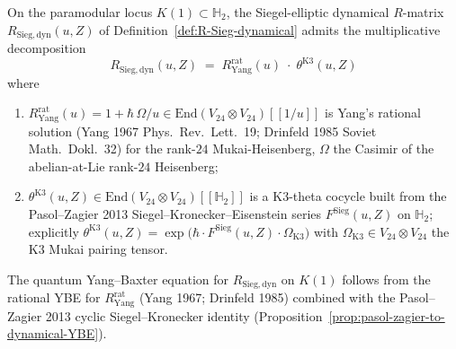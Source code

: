 \begin{theorem}
\label{thm:kcb-r-sieg-factorisation}
On the paramodular locus $K(1)\subset\mathbb{H}_2$, the
Siegel-elliptic dynamical $R$-matrix
$R_{\mathrm{Sieg,dyn}}(u, Z)$ of Definition~\ref{def:R-Sieg-dynamical}
admits the multiplicative decomposition
\[
 R_{\mathrm{Sieg,dyn}}(u, Z)
 \;=\; R^{\mathrm{rat}}_{\mathrm{Yang}}(u)\;\cdot\;
 \theta^{\mathrm{K3}}(u, Z)
\]
where
\begin{enumerate}[label=\textup{(\alph*)}]
\item $R^{\mathrm{rat}}_{\mathrm{Yang}}(u) = 1 + \hbar\,\Omega/u \in
 \mathrm{End}(V_{24}\otimes V_{24})[[1/u]]$ is Yang's rational solution
 (Yang 1967 \textup{Phys.~Rev.~Lett.}~19; Drinfeld 1985
 \textup{Soviet Math.~Dokl.}~32) for the rank-$24$ Mukai-Heisenberg,
 $\Omega$ the Casimir of the abelian-at-Lie rank-$24$ Heisenberg;
\item $\theta^{\mathrm{K3}}(u, Z)\in
 \mathrm{End}(V_{24}\otimes V_{24})[[\mathbb{H}_2]]$ is a K3-theta cocycle
 built from the Pasol--Zagier 2013 Siegel--Kronecker--Eisenstein
 series $F^{\mathrm{Sieg}}(u, Z)$ on $\mathbb{H}_2$; explicitly
 $\theta^{\mathrm{K3}}(u,Z) = \exp\bigl(\hbar\cdot
 F^{\mathrm{Sieg}}(u,Z)\cdot \Omega_{\mathrm{K3}}\bigr)$ with
 $\Omega_{\mathrm{K3}}\in V_{24}\otimes V_{24}$ the K3 Mukai pairing
 tensor.
\end{enumerate}
The quantum Yang--Baxter equation for $R_{\mathrm{Sieg,dyn}}$ on $K(1)$
follows from the rational YBE for $R^{\mathrm{rat}}_{\mathrm{Yang}}$
(Yang 1967; Drinfeld 1985) combined with the Pasol--Zagier 2013
cyclic Siegel--Kronecker identity
(Proposition~\ref{prop:pasol-zagier-to-dynamical-YBE}).
\end{theorem}

